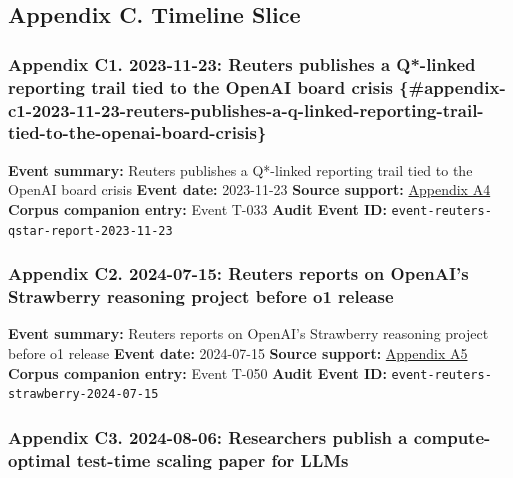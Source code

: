 \documentclass[
  american,
  11pt,
  letterpaper,
]{article}
\begin{document}
\subsection{Appendix C. Timeline
Slice}\label{appendix-c.-timeline-slice}

\subsubsection{Appendix C1. 2023-11-23: Reuters publishes a Q*-linked
reporting trail tied to the OpenAI board crisis
\{\#appendix-c1-2023-11-23-reuters-publishes-a-q-linked-reporting-trail-tied-to-the-openai-board-crisis\}}\label{appendix-c1.-2023-11-23-reuters-publishes-a-q-linked-reporting-trail-tied-to-the-openai-board-crisis-appendix-c1-2023-11-23-reuters-publishes-a-q-linked-reporting-trail-tied-to-the-openai-board-crisis}

\textbf{Event summary:} Reuters publishes a Q*-linked reporting trail
tied to the OpenAI board crisis \textbf{Event date:} 2023-11-23
\textbf{Source support:}
\hyperref[appendix-a4-openai-researchers-warned-board-of-ai-breakthrough-ahead-of-ceo-ouster-sources-say]{Appendix
A4} \textbf{Corpus companion entry:} Event T-033 \textbf{Audit Event
ID:} \texttt{event-reuters-qstar-report-2023-11-23}

\subsubsection{Appendix C2. 2024-07-15: Reuters reports on OpenAI's
Strawberry reasoning project before o1
release}\label{appendix-c2-2024-07-15-reuters-reports-on-openai-s-strawberry-reasoning-project-before-o1-release}

\textbf{Event summary:} Reuters reports on OpenAI's Strawberry reasoning
project before o1 release \textbf{Event date:} 2024-07-15 \textbf{Source
support:}
\hyperref[appendix-a5-exclusive-openai-working-on-new-reasoning-technology-under-code-name-strawberry]{Appendix
A5} \textbf{Corpus companion entry:} Event T-050 \textbf{Audit Event
ID:} \texttt{event-reuters-strawberry-2024-07-15}

\subsubsection{Appendix C3. 2024-08-06: Researchers publish a
compute-optimal test-time scaling paper for
LLMs}\label{appendix-c3-2024-08-06-researchers-publish-a-compute-optimal-test-time-scaling-paper-for-llms}
\end{document}
